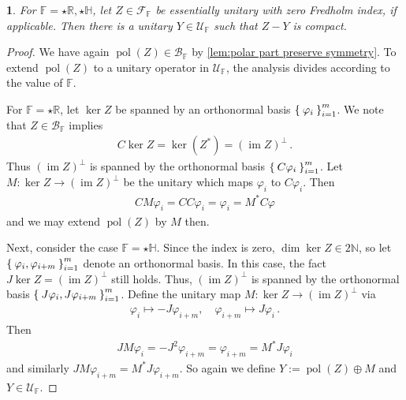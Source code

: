 \documentclass[a4paper,10pt]{article}
\numberwithin{equation}{section}
\theoremstyle{plain}
\theoremstyle{plain}
\newtheorem{lem}[thm]{\protect\lemmaname}
\theoremstyle{plain}
\theoremstyle{plain}
\theoremstyle{plain}
\theoremstyle{remark}
\theoremstyle{definition}
\theoremstyle{plain}
\providecommand{\lemmaname}{Lemma}
\newcommand{\NN}{\mathbb{N}}
\newcommand{\RR}{\mathbb{R}}
\newcommand{\FF}{\mathbb{F}}
\newcommand{\calB}{\mathcal{B}}
\newcommand{\calC}{\mathcal{C}}
\newcommand{\calF}{\mathcal{F}}
\newcommand{\calU}{\mathcal{U}}
\newcommand{\calH}{\mathcal{H}}
\newcommand{\calP}{\mathcal{P}}
\newcommand{\ip}[2]{\langle #1, #2 \rangle}
\newcommand{\vf}{\varphi}
\newcommand{\HH}{\mathbb{H}}
\newcommand{\im}{\operatorname{im}}
\newcommand{\eq}[1]{\begin{align*}#1\end{align*}}
\newcommand{\polar}{\operatorname{pol}}
\begin{document}
	
	
	
	\begin{lem}\label{lem:extension of star fredholm partial isometries}
		For $\FF=\star\RR,\star\HH$, let $Z\in\calF_\FF$ be essentially unitary with zero Fredholm index, if applicable. Then there is a unitary $Y\in\calU_\FF$ such that $Z-Y$ is compact.
	\end{lem}
	\begin{proof}
		We have again $\polar(Z)\in \calB_\FF$ by \cref{lem:polar part preserve symmetry}. To extend $\polar(Z)$ to a unitary operator in $\calU_\FF$, the analysis divides according to the value of $\FF$. 
		
		For $\FF=\star\RR$, let $\ker Z$ be spanned by an orthonormal basis $\Set{\vf_i}_{i=1}^m$. We note that $Z\in\calB_\FF$ implies \eq{C\ker Z=\ker(Z^\ast)=(\im Z)^\perp\,.} 
		Thus $(\im Z)^\perp$ is spanned by the orthonormal basis $\Set{C\varphi_i}_{i=1}^m$. Let $M:\ker Z\to(\im Z)^\perp$ be the unitary which maps $\varphi_i$ to $C\varphi_i$. Then \eq{CM\varphi_i=CC\varphi_i=\varphi_i=M^*C\varphi} and we may extend $\polar(Z)$ by $M$ then.
		
		Next, consider the case $\FF=\star\HH$. Since the index is zero, $\dim\ker Z\in 2\NN$, so let $\Set{\varphi_i,\varphi_{i+m}}_{i=1}^m$ denote an orthonormal basis. In this case, the fact $J\ker Z=(\im Z)^\perp$ still holds. Thus, $(\im Z)^\perp$ is spanned by the orthonormal basis $\Set{J\varphi_i,J\varphi_{i+m}}_{i=1}^m$. Define the unitary map $M:\ker Z\to (\im Z)^\perp$ via\eq{\vf_i\mapsto -J\vf_{i+m},\quad \vf_{i+m}\mapsto J\vf_i\,.} 
		Then \eq{JM\vf_i=-J^2\vf_{i+m}=\vf_{i+m}=M^*J\vf_i} and similarly $JM\vf_{i+m}=M^*J\vf_{i+m}$. So again we define $Y:=\polar(Z)\oplus M$ and $Y\in\calU_\FF$.
	\end{proof}
	
		
\end{document}
